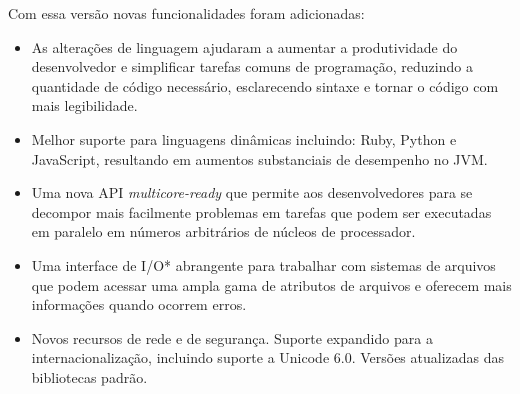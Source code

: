 Com essa versão novas funcionalidades foram adicionadas:

\begin{itemize}
  \item As alterações de linguagem ajudaram a aumentar a produtividade do desenvolvedor e simplificar tarefas comuns de programação, reduzindo a quantidade de código necessário, esclarecendo sintaxe e tornar o código com mais legibilidade.
  \item Melhor suporte para linguagens dinâmicas incluindo: Ruby, Python e JavaScript, resultando em aumentos substanciais de desempenho no JVM.
  \item Uma nova API {\it multicore-ready} que permite aos desenvolvedores para se decompor mais facilmente problemas em tarefas que podem ser executadas em paralelo em números arbitrários de núcleos de processador.
  \item Uma interface de I/O* abrangente para trabalhar com sistemas de arquivos que podem acessar uma ampla gama de atributos de arquivos e oferecem mais informações quando ocorrem erros.
  \item Novos recursos de rede e de segurança. Suporte expandido para a internacionalização, incluindo suporte a Unicode 6.0. Versões atualizadas das bibliotecas padrão.\\
\end{itemize}

